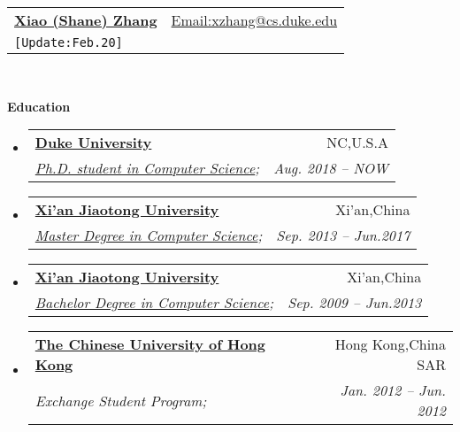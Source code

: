\documentclass[letterpaper,11pt]{article}
\makeatletter
\newcommand{\resheading}[1]{{\large \colorbox{mygrey}{\begin{minipage}{\textwidth}{\textbf{#1 \vphantom{p\^{E}}}}\end{minipage}}}}
\newcommand{\ressubheading}[4]{
\begin{tabular*}{6.5in}{l@{\extracolsep{\fill}}r}
		\textbf{#1} & #2 \\
		\textit{#3} & \textit{#4} \\
\end{tabular*}\vspace{-6pt}}
\makeatother
\begin{document}
\newcommand{\mywebheader}{
\begin{tabular*}{7in}{l@{\extracolsep{\fill}}r}
	\textbf{\href{http://www.shane6.net/}{\LARGE Xiao (Shane) Zhang}} & \href{mailto:xzhang@cs.duke.edu}{Email:xzhang@cs.duke.edu}\\
	{\footnotesize \texttt{{[Update:Feb.20]}}}  \\
	\end{tabular*}
\\
\vspace{0.1in}}

\mywebheader

\resheading{Education}
	\begin{itemize}
		\item
			\ressubheading{\href{http://www.duke.edu}{Duke University}}{NC,U.S.A}{\href{http://www.cs.duke.edu}{Ph.D. student in Computer Science};}{Aug. 2018 -- NOW }
		\item
			\ressubheading{\href{http://www.xjtu.edu.cn}{Xi'an Jiaotong University}}{Xi'an,China}{\href{http://www.cs.xjtu.edu.cn}{Master Degree in Computer Science};}{Sep. 2013 -- Jun.2017 }
		\item
			\ressubheading{\href{http://www.xjtu.edu.cn}{Xi'an Jiaotong University}}{Xi'an,China}{\href{http://www.cs.xjtu.edu.cn}{Bachelor Degree in Computer Science};}{Sep. 2009 --  Jun.2013}
		\item
			\ressubheading{\href{http://www.cuhk.edu.hk}{The Chinese University of Hong Kong}}{Hong Kong,China SAR}{{Exchange Student Program};}{Jan. 2012 -- Jun. 2012}
	\end{itemize} %
\end{document}
